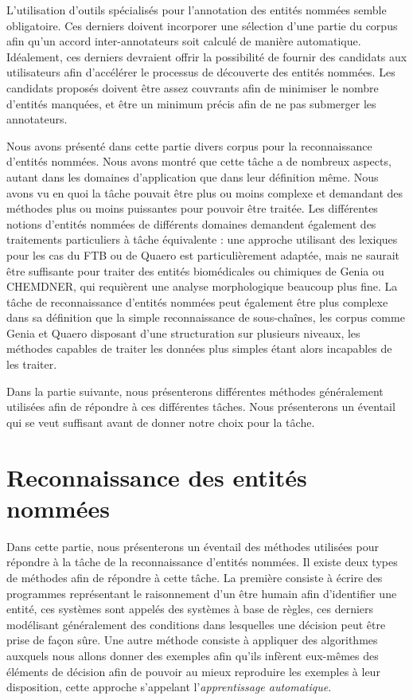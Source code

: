 \documentclass[12pt,a4paper,times,twoside,openright]{report}
\begin{document}
L'utilisation d'outils spécialisés pour l'annotation des entités nommées semble obligatoire. Ces derniers doivent incorporer une sélection d'une partie du corpus afin qu'un accord inter-annotateurs soit calculé de manière automatique. Idéalement, ces derniers devraient offrir la possibilité de fournir des candidats aux utilisateurs afin d'accélérer le processus de découverte des entités nommées. Les candidats proposés doivent être assez couvrants afin de minimiser le nombre d'entités manquées, et être un minimum précis afin de ne pas submerger les annotateurs.

Nous avons présenté dans cette partie divers corpus pour la reconnaissance d'entités nommées. Nous avons montré que cette tâche a de nombreux aspects, autant dans les domaines d'application que dans leur définition même. Nous avons vu en quoi la tâche pouvait être plus ou moins complexe et demandant des méthodes plus ou moins puissantes pour pouvoir être traitée. Les différentes notions d'entités nommées de différents domaines demandent également des traitements particuliers à tâche équivalente : une approche utilisant des lexiques pour les cas du FTB ou de Quaero est particulièrement adaptée, mais ne saurait être suffisante pour traiter des entités biomédicales ou chimiques de Genia ou CHEMDNER, qui requièrent une analyse morphologique beaucoup plus fine. La tâche de reconnaissance d'entités nommées peut également être plus complexe dans sa définition que la simple reconnaissance de sous-chaînes, les corpus comme Genia et Quaero disposant d'une structuration sur plusieurs niveaux, les méthodes capables de traiter les données plus simples étant alors incapables de les traiter.

Dans la partie suivante, nous présenterons différentes méthodes généralement utilisées afin de répondre à ces différentes tâches. Nous présenterons un éventail qui se veut suffisant avant de donner notre choix pour la tâche.



\chapter{Reconnaissance des entités nommées}
\label{chap:NER}
\minitoc
Dans cette partie, nous présenterons un éventail des méthodes utilisées pour répondre à la tâche de la reconnaissance d'entités nommées. Il existe deux types de méthodes afin de répondre à cette tâche. La première consiste à écrire des programmes représentant le raisonnement d'un être humain afin d'identifier une entité, ces systèmes sont appelés des systèmes à base de règles, ces derniers modélisant généralement des conditions dans lesquelles une décision peut être prise de façon sûre. Une autre méthode consiste à appliquer des algorithmes auxquels nous allons donner des exemples afin qu'ils infèrent eux-mêmes des éléments de décision afin de pouvoir au mieux reproduire les exemples à leur disposition, cette approche s'appelant l'\emph{apprentissage automatique}.
\end{document}
